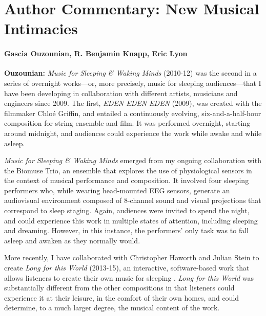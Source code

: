 \section*{Author Commentary: New Musical Intimacies}

\paragraph{Gascia Ouzounian, R. Benjamin Knapp, Eric Lyon}

\textbf{Ouzounian:} \textit{Music for Sleeping \& Waking Minds} (2010-12) was the second in a series of overnight works---or, more precisely, music for sleeping audiences---that I have been developing in collaboration with different artists, musicians and engineers since 2009. The first, \textit{EDEN EDEN EDEN} (2009), was created with the filmmaker Chlo\'e Griffin, and entailed a continuously evolving, six-and-a-half-hour composition for string ensemble and film. It was performed overnight, starting around midnight, and audiences could experience the work while awake and while asleep.

\textit{Music for Sleeping \& Waking Minds }emerged from my ongoing collaboration with the Biomuse Trio, an ensemble that explores the use of physiological sensors in the context of musical performance and composition. \cite{Lyon:2014,Ouzounian:2012} It involved four sleeping performers who, while wearing head-mounted EEG sensors, generate an audiovisual environment composed of 8-channel sound and visual projections that correspond to sleep staging. Again, audiences were invited to spend the night, and could experience this work in multiple states of attention, including sleeping and dreaming. However, in this instance, the performers' only task was to fall asleep and awaken as they normally would.

More recently, I have collaborated with Christopher Haworth and Julian Stein to create \textit{Long for this World} (2013-15), an interactive, software-based work that allows listeners to create their own music for sleeping \cite{Ouzounian:2013}. \textit{Long for this World} was substantially different from the other compositions in that listeners could experience it at their leisure, in the comfort of their own homes, and could determine, to a much larger degree, the musical content of the work.

